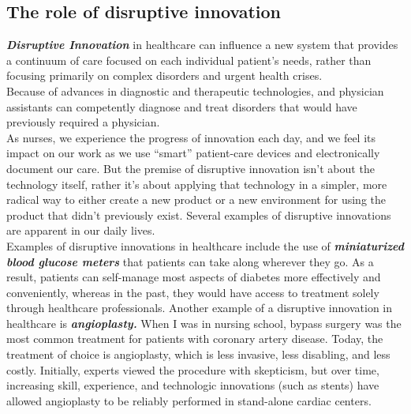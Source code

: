 \documentclass[12pts]{article}
\begin{document}
\begin{large}


\subsection*{The role of disruptive innovation}

\textbf{\textit{Disruptive Innovation}} in healthcare can influence a new system that provides a continuum of care focused on each individual patient's needs, rather than focusing primarily on complex disorders and urgent health crises.\\ Because of advances in diagnostic and therapeutic technologies, and physician assistants can competently diagnose and treat disorders that would have previously required a physician.\\
As nurses, we experience the progress of innovation each day, and we feel its impact on our work as we use “smart” patient-care devices and electronically document our care. But the premise of disruptive innovation isn't about the technology itself, rather it's about applying that technology in a simpler, more radical way to either create a new product or a new environment for using the product that didn't previously exist. Several examples of disruptive innovations are apparent in our daily lives.\\
Examples of disruptive innovations in healthcare include the use of \textbf{\textit{miniaturized blood glucose meters}} that patients can take along wherever they go. As a result, patients can self-manage most aspects of diabetes more effectively and conveniently, whereas in the past, they would have access to treatment solely through healthcare professionals. Another example of a disruptive innovation in healthcare is \textbf{\textit{angioplasty.}} When I was in nursing school, bypass surgery was the most common treatment for patients with coronary artery disease. Today, the treatment of choice is angioplasty, which is less invasive, less disabling, and less costly. Initially, experts viewed the procedure with skepticism, but over time, increasing skill, experience, and technologic innovations (such as stents) have allowed angioplasty to be reliably performed in stand-alone cardiac centers.

\end{large}
\end{document}
